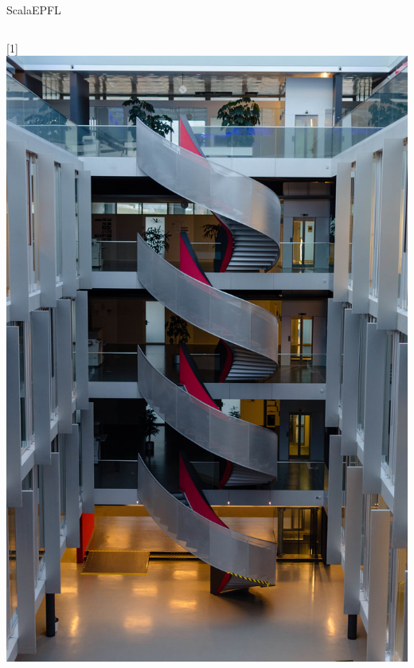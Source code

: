 \documentclass[aspectratio=169]{beamer}
\begin{document}
\begin{frame}{Scala}{EPFL}
  \begin{columns}
    \centering\scalebox{-1}[1]{\includegraphics[height=0.9\textheight]{stair.jpg}}

\end{columns}
\end{frame}
\end{document}
